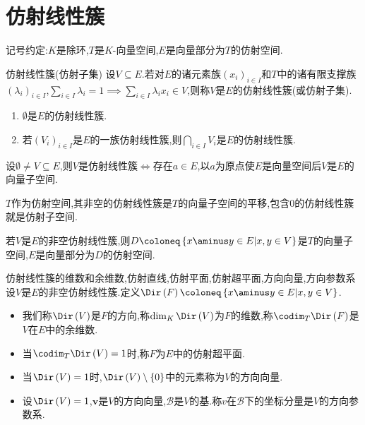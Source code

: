 \section{仿射线性簇}

记号约定:$K$是除环,$T$是$K$-向量空间,$E$是向量部分为$T$的仿射空间.

\begin{definition}{仿射线性簇(仿射子集)}{}
	设$V\subseteq E$.若对$E$的诸元素族$\left(x_{i}\right)_{i\in I}$和$T$中的诸有限支撑族$\left(\lambda_{i}\right)_{i\in I}$,$\sum\limits_{i\in I}\lambda_{i}=1\implies\sum\limits_{i\in I}\lambda_{i}x_{i}\in V$,则称$V$是$E$的仿射线性簇(或仿射子集).
\end{definition}

\begin{proposition}{}{}
	\begin{enumerate}
		\item $\emptyset$是$E$的仿射线性簇.
		\item 若$\left(V_{i}\right)_{i\in I}$是$E$的一族仿射线性簇,则$\bigcap\limits_{i\in I}V_{i}$是$E$的仿射线性簇.
	\end{enumerate}
\end{proposition}

\begin{proposition}{}{}
	设$\emptyset\neq V\subseteq E$,则$V$是仿射线性簇$\iff$存在$a\in E$,以$a$为原点使$E$是向量空间后$V$是$E$的向量子空间.
\end{proposition}

\begin{corollary}{}{}
	$T$作为仿射空间,其非空的仿射线性簇是$T$的向量子空间的平移,包含$0$的仿射线性簇就是仿射子空间.
\end{corollary}

\begin{proposition}{}{}
	若$V$是$E$的非空仿射线性簇,则$D\coloneq\left\{x\aminus y\in E\middle|x,y\in V\right\}$是$T$的向量子空间,$E$是向量部分为$D$的仿射空间.
\end{proposition}

\begin{definition}{仿射线性簇的维数和余维数,仿射直线,仿射平面,仿射超平面,方向向量,方向参数系}{}
	设$V$是$E$的非空仿射线性簇.定义$\Dir\left(F\right)\coloneq\left\{x\aminus y\in E\middle|x,y\in V\right\}$.
	\begin{itemize}
		\item 我们称$\Dir\left(V\right)$是$F$的方向,称$\dim_{K}\Dir\left(V\right)$为$F$的维数,称$\codim_{T}\Dir\left(F\right)$是$V$在$E$中的余维数.
		\item 当$\codim_{T}\Dir\left(V\right)=1$时,称$F$为$E$中的仿射超平面.
		\item 当$\Dir\left(V\right)=1$时,$\Dir\left(V\right)\setminus\left\{0\right\}$中的元素称为$V$的方向向量.
		\item 设$\Dir\left(V\right)=1$,$\mathbf{v}$是$V$的方向向量,$\mathcal{B}$是$V$的基.称$v$在$\mathcal{B}$下的坐标分量是$V$的方向参数系.
	\end{itemize}
\end{definition}

